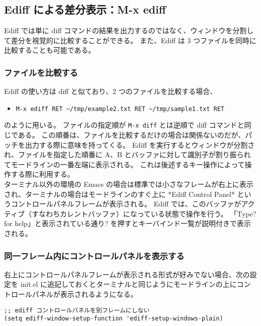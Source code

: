 \subsection{Ediff による差分表示：M-x ediff}
Ediff では単に diff コマンドの結果を出力するのではなく、ウィンドウを分割して差分を視覚的に比較することができる。
また、Ediff は 3 つファイルを同時に比較することも可能である。
\subsubsection{ファイルを比較する}
Ediff の使い方は diff と似ており、2 つのファイルを比較する場合、
\begin{itemize}\setlength{\leftskip}{-1.00zw}%
\item[] \texttt{M-x ediff RET \textasciitilde{}/tmp/example2.txt RET \textasciitilde{}/tmp/sample1.txt RET}
\end{itemize}
のように用いる。
ファイルの指定順が \texttt{M-x diff} とは逆順で diff コマンドと同じである。
この順番は、ファイルを比較するだけの場合は関係ないのだが、パッチを出力する際に意味を持ってくる。
Ediff  を実行するとウィンドウが分割され、ファイルを指定した順番に A、B とバッファに対して識別子が割り振られてモードラインの一番左端に表示される。
これは後述するキー操作によって操作する際に利用する。\\

ターミナル以外の環境の Emacs の場合は標準では小さなフレームが右上に表示され、ターミナルの場合はモードラインのすぐ上に *Ediff Control Panel* というコントロールパネルフレームが表示される。
Ediff では、このバッファがアクティブ（すなわちカレントバッファ）になっている状態で操作を行う。
「Type\hphantom{.}? for help」と表示されている通り\hphantom{.}? を押すとキーバインド一覧が説明付きで表示される。
\subsubsection{同一フレーム内にコントロールパネルを表示する}
右上にコントロールパネルフレームが表示される形式が好みでない場合、次の設定を init.el に追記しておくとターミナルと同じようにモードラインの上にコントロールパネルが表示されるようになる。
\begin{mdframed}[roundcorner=0.50zw,leftmargin=3.00zw,rightmargin=3.00zw,skipabove=0.40zw,skipbelow=0.40zw,innertopmargin=4.00pt,innerbottommargin=4.00pt,innerleftmargin=5.00pt,innerrightmargin=5.00pt,linecolor=gray!020,linewidth=0.50pt,backgroundcolor=gray!20]
\begin{verbatim}
;; ediff コントロールパネルを別フレームにしない
(setq ediff-window-setup-function 'ediff-setup-windows-plain)
\end{verbatim}
\end{mdframed}
